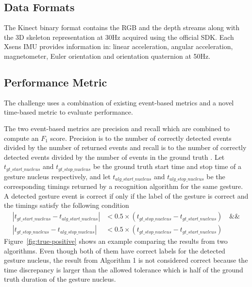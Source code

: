\subsection{Data Formats}
The Kinect binary format contains the RGB and the depth streams along with the
3D skeleton representation at 30Hz acquired using the official SDK. Each Xsens IMU
provides information in: linear acceleration, angular acceleration,
magnetometer, Euler orientation and orientation quaternion at 50Hz.

\subsection{Performance Metric}\label{sec:chairgest-metric}
The challenge uses a combination of existing event-based metrics and a novel
time-based metric to evaluate performance. 

The two event-based metrics are
precision and recall which are combined to compute an $F_1$ score. Precision is
to the number of correctly detected events divided by the number of returned events and recall 
is to the number of correctly detected events divided by the number of
events in the ground truth \cite{Ruffieux2013}. Let
$t_{gt\_start\_nucleus}$ and $t_{gt\_stop\_nucleus}$ be the ground truth start time and stop time of a gesture nucleus respectively,
and let $t_{alg\_start\_nucleus}$ and $t_{alg\_stop\_nucleus}$ be the
corresponding timings returned by a recognition algorithm for the same gesture.
A detected gesture event is correct if only if the label of the gesture is
correct and the timings satisfy the following condition
\begin{align*}
|t_{gt\_start\_nucleus} - t_{alg\_start\_nucleus}| &< 0.5\times
(t_{gt\_stop\_nucleus} - t_{gt\_start\_nucleus}) \quad \text{\&\&} \\
|t_{gt\_stop\_nucleus} - t_{alg\_stop\_nucleus}| &< 0.5\times
(t_{gt\_stop\_nucleus} - t_{gt\_start\_nucleus})
\end{align*}
Figure~\ref{fig:true-positive} shows an example comparing the results from two
algorithms. Even though both of them have correct labels for the detected
gesture nucleus, the result from Algorithm 1 is not considered correct because
the time discrepancy is larger than the allowed tolerance which is half of the
ground truth duration of the gesture nucleus.


